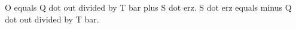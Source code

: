 O equals Q dot out divided by T bar plus S dot erz.  
S dot erz equals minus Q dot out divided by T bar.